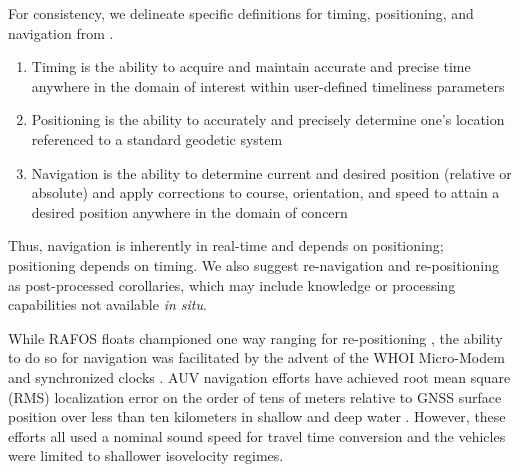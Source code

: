 
For consistency, we delineate specific definitions for timing, positioning, and navigation from \citet{howe2019observing}.
\begin{enumerate}
	\item Timing is the ability to acquire and maintain accurate and precise time anywhere in the domain of interest within user-defined timeliness parameters
	\item Positioning is the ability to accurately and precisely determine one's location referenced to a standard geodetic system
	\item Navigation is the ability to determine current and desired position (relative or absolute) and apply corrections to course, orientation, and speed to attain a desired position anywhere in the domain of concern
\end{enumerate}
Thus, navigation is inherently in real-time and depends on positioning; positioning depends on timing.
We also suggest re-navigation and re-positioning as post-processed corollaries, which may include knowledge or processing capabilities not available \textit{in situ}.

While RAFOS floats championed one way ranging for re-positioning \citep{Rossby1986,Duda2006}, the ability to do so for navigation was facilitated by  the advent of the WHOI Micro-Modem \citep{Singh2006} and synchronized clocks \citep{rypkema_one-way_2017}.
AUV navigation efforts have achieved root mean square (RMS) localization error on the order of tens of meters relative to GNSS surface position over less than ten kilometers in shallow \citep{Eustice2007,Kepper2017,Claus2018} and deep water \citep{Kunz2008,Jakuba2008,Webster2009}.
However, these efforts all used a nominal sound speed for travel time conversion and the vehicles were limited to shallower isovelocity regimes.

